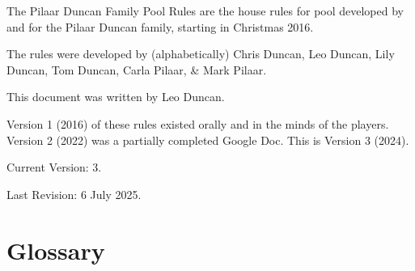 \documentclass[a4paper, twocolumn]{article}
\newcommand{\currentversion}{3}
\newcommand{\currentversiondate}{6 July 2025}
\begin{document}
\setlength{\parindent}{0pt}

The Pilaar Duncan Family Pool Rules are the house rules for pool developed by and for the Pilaar Duncan family, starting in Christmas 2016.
\vspace{1em}

The rules were developed by (alphabetically) Chris Duncan, Leo Duncan, Lily Duncan, Tom Duncan, Carla Pilaar, \& Mark Pilaar.
\vspace{1em}

This document was written by Leo Duncan.
\vspace{1em}

Version 1 (2016) of these rules existed orally and in the minds of the players. Version 2 (2022) was a partially completed Google Doc. This is Version 3 (2024).
\vspace{1em}

Current Version: \currentversion{}.

Last Revision: \currentversiondate.

\newpage

\section{Glossary} \label{glossary}
\end{document}
